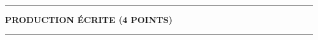 \documentclass[a3paper,landscape,10pt]{article}
\begin{document}
{\begin{multicols}{2}


\begin{flushleft}\hrule\vspace{2mm}\begin{center}\large\bf PRODUCTION ÉCRITE  (4  POINTS) \end{center}
\vspace{1mm}\hrule \end{flushleft}









\end{multicols}

}
\end{document}
